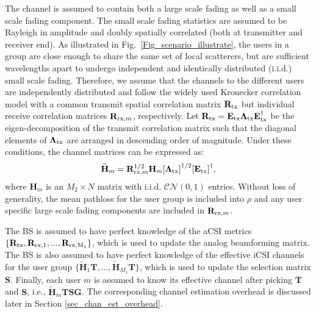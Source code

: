 \documentclass[journal,comsoc]{IEEEtran}
\begin{document}
The channel is assumed to contain both a large scale fading as well as a small scale fading component. The small scale fading statistics are assumed to be Rayleigh in amplitude and doubly spatially correlated (both at transmitter and receiver end). As illustrated in Fig.~\ref{Fig_scenario_illustrate}, the users in a group are close enough to share the same set of local scatterers, but are sufficient wavelengths apart to undergo independent and identically distributed (i.i.d.) small scale fading. Therefore, we assume that the channels to the different users are independently distributed and follow the widely used Kronecker correlation model \cite{Kronecker_validity} with a common transmit spatial correlation matrix $\mathbf{R}_{{\rm tx}}$ but individual receive correlation matrices $\mathbf{R}_{{\rm rx},m}$, respectively. Let $\mathbf{R}_{\rm tx} = \mathbf{E}_{\rm tx} \mathbf{\Lambda}_{\rm tx} \mathbf{E}_{\rm tx}^{\dag}$ be the eigen-decomposition of the transmit correlation matrix such that the diagonal elements of $\mathbf{\Lambda}_{\rm tx}$ are arranged in descending order of magnitude. 
Under these conditions, the channel matrices can be expressed as:
\begin{eqnarray}
\widetilde{\mathbf{H}}_m = \mathbf{R}_{{\rm rx},m}^{1/2} \mathbf{H}_m {[\boldsymbol{\Lambda}_{\rm tx}]}^{1/2} {[\mathbf{E}_{\rm tx}]}^{\dag}, \label{eqn_channel_KL_exapnsion}
\end{eqnarray}
where $\mathbf{H}_m$ is an $M_2 \times N$ matrix with i.i.d. $\mathcal{CN}(0, 1)$ entries. Without loss of generality, the mean pathloss for the user group is included into $\rho$ and any user specific large scale fading components are included in $\mathbf{R}_{{\rm rx}, m}$. 

The BS is assumed to have perfect knowledge of the aCSI metrics $\{\mathbf{R}_{\rm tx}, \mathbf{R}_{\rm rx,1}, ..., \mathbf{R}_{\rm rx,M_1}\}$, which is used to update the analog beamforming matrix. The BS is also assumed to have perfect knowledge of the effective iCSI channels for the user group $\{\widetilde{\mathbf{H}}_{1} \mathbf{T}, ..., \widetilde{\mathbf{H}}_{M_1} \mathbf{T}\}$, which is used to update the selection matrix $\mathbf{S}$. Finally, each user $m$ is assumed to know its effective channel after picking $\mathbf{T}$ and $\mathbf{S}$, i.e., $\widetilde{\mathbf{H}}_{m} \mathbf{T S G}$. The corresponding channel estimation overhead is discussed later in Section \ref{sec_chan_est_overhead}. 
% 
%
%
\end{document}
